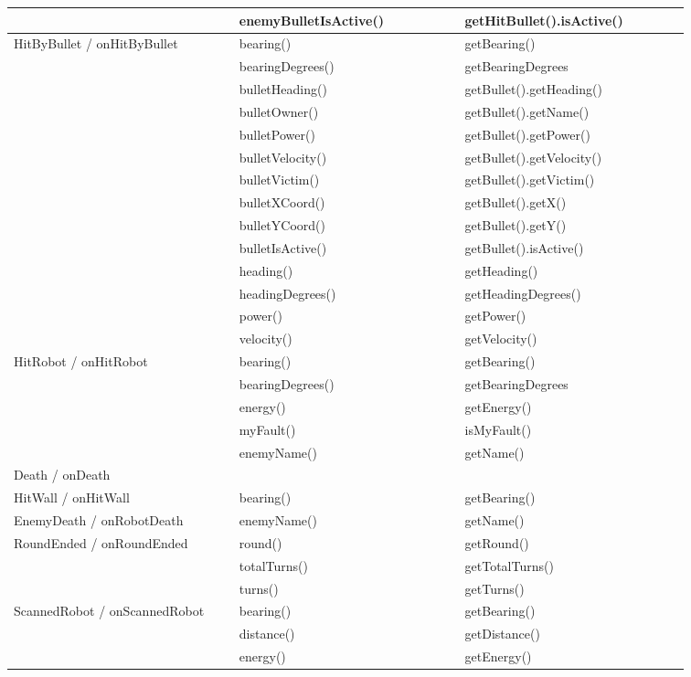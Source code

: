 \begin{center}
\begin{tabular}{ | p{0.3\linewidth} | p{0.3\linewidth} | p{0.3\linewidth} |}
		& enemyBulletIsActive() & getHitBullet().isActive() \\ \hline
		HitByBullet / onHitByBullet& bearing() & getBearing() \\ \hline
		& bearingDegrees() & getBearingDegrees \\ \hline
		& bulletHeading() & getBullet().getHeading() \\ \hline
		& bulletOwner() & getBullet().getName() \\ \hline
		& bulletPower() & getBullet().getPower() \\ \hline
		& bulletVelocity() & getBullet().getVelocity() \\ \hline
		& bulletVictim() & getBullet().getVictim() \\ \hline
		& bulletXCoord() & getBullet().getX() \\ \hline
		& bulletYCoord() & getBullet().getY() \\ \hline
		& bulletIsActive() & getBullet().isActive() \\ \hline
		& heading() & getHeading() \\ \hline
		& headingDegrees() & getHeadingDegrees() \\ \hline
		& power() & getPower() \\ \hline
		& velocity() & getVelocity() \\ \hline
		HitRobot / onHitRobot & bearing() & getBearing() \\ \hline
		& bearingDegrees() & getBearingDegrees \\ \hline
		& energy() & getEnergy() \\ \hline
		& myFault() & isMyFault() \\ \hline
		& enemyName() & getName() \\ \hline
		Death / onDeath & & \\ \hline
		HitWall / onHitWall & bearing() & getBearing() \\ \hline
		EnemyDeath / onRobotDeath & enemyName() & getName() \\ \hline
		RoundEnded / onRoundEnded & round() & getRound() \\ \hline
		& totalTurns() & getTotalTurns() \\ \hline
		& turns() & getTurns() \\ \hline
		ScannedRobot / onScannedRobot & bearing() & getBearing() \\ \hline
		& distance() & getDistance() \\ \hline
		& energy() & getEnergy() \\ \hline

\end{tabular}
\end{center}
